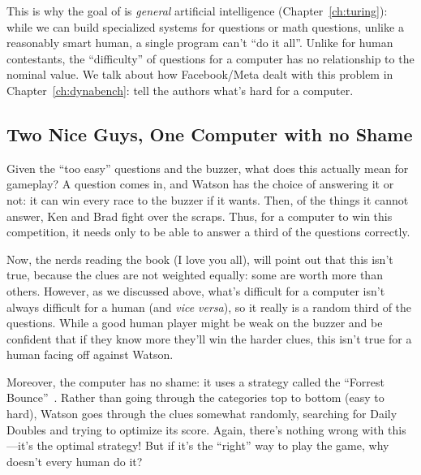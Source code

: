 This is why the goal of  is \emph{general} artificial
intelligence (Chapter~\ref{ch:turing}): while we can build specialized
systems for \jeopardy{} questions or math questions, unlike a
reasonably smart human, a single program can't ``do it all''.
%
Unlike for human contestants, the ``difficulty'' of \jeopardy{}
questions for a computer has no relationship to the nominal value.
%
We talk about how Facebook/Meta dealt with this problem in
Chapter~\ref{ch:dynabench}: tell the authors what's hard for a computer.


\subsection{Two Nice Guys, One Computer with no Shame}

Given the ``too easy'' questions and the buzzer, what does this
actually mean for gameplay?
%
A question comes in, and Watson has the choice of answering it or not:
it can win every race to the buzzer if it wants.
%
Then, of the things it cannot answer, Ken and Brad fight over the
scraps.
%
Thus, for a computer to win this competition, it needs only to be able
to answer a third of the questions correctly.

Now, the \jeopardy{} nerds reading the book (I love you all), will
point out that this isn't true, because the clues are not weighted
equally: some are worth more than others.
%
However, as we discussed above, what's difficult for a computer isn't
always difficult for a human (and \textit{vice versa}), so it really
is a random third of the questions.
%
While a good human player might be weak on the buzzer and be confident
that if they know more they'll win the harder clues, this isn't true
for a human facing off against Watson.

Moreover, the computer has no shame: it uses a strategy called the
``Forrest Bounce''~\citep[more infamously associated with James Holzhauer
and Arthur Chu]{rogak-20}.
%
Rather than going through the categories top to bottom (easy to hard),
Watson goes through the clues somewhat randomly, searching for Daily
Doubles and trying to optimize its score.
%
Again, there's nothing wrong with this---it's the optimal strategy!
%
But if it's the ``right'' way to play the game, why doesn't every
human do it?


